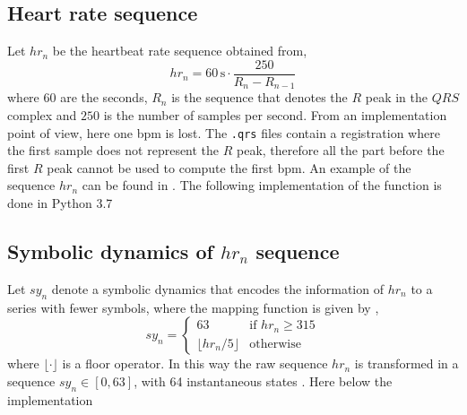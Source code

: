 
\subsection{Heart rate sequence}
Let $hr_n$ be the heartbeat rate sequence obtained from,
\begin{equation}
hr_n = 60\, \text{s} \cdot \frac{250}{R_n - R_{n-1}}
\end{equation}
where $60$ are the seconds, $R_n$ is the sequence that denotes the $R$ peak in the $QRS$ complex and $250$ is the number of samples per second. From an implementation point of view, here one bpm is lost. The \verb|.qrs| files contain a registration where the first sample does not represent the $R$ peak, therefore all the part before the first $R$ peak cannot be used to compute the first bpm. An example of the sequence $hr_n$ can be found in . The following implementation of the function is done in Python 3.7

\subsection{Symbolic dynamics of $hr_n$ sequence}
Let $sy_n$ denote a symbolic dynamics that encodes the information of $hr_n$ to a series with fewer symbols, where the mapping function is given by \cite[p. 3]{zhou2015},
\begin{equation}
sy_n = \begin{cases}
63 & \text{if $hr_n \ge 315$} \\
\lfloor hr_n / 5 \rfloor & \text{otherwise}
\end{cases}
\end{equation}
where $\lfloor \cdot \rfloor$ is a floor operator. In this way the raw sequence $hr_n$ is transformed in a sequence $sy_n \in [0, 63]$, with 64 instantaneous states . Here below the implementation

